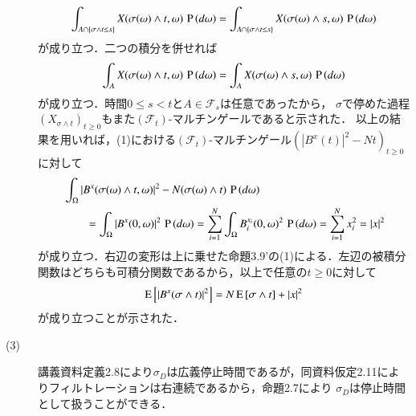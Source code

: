 \begin{prf}
\begin{description}
		\begin{align}
			\int_{A \cap \{ \sigma \wedge t \leq s \}} X(\sigma(\omega) \wedge t, \omega)\, \operatorname{P} \left(d\omega\right)
			= \int_{A \cap \{ \sigma \wedge t \leq s \}} X(\sigma(\omega) \wedge s, \omega)\, \operatorname{P} \left(d\omega\right)
		\end{align}
		が成り立つ．二つの積分を併せれば
		\begin{align}
			\int_{A} X(\sigma(\omega) \wedge t, \omega)\, \operatorname{P} \left(d\omega\right)
			= \int_{A} X(\sigma(\omega) \wedge s, \omega)\, \operatorname{P} \left(d\omega\right)
		\end{align}
		が成り立つ．時間$0 \leq s < t$と$A \in \mathcal{F}_s$は任意であったから，
		$\sigma$で停めた過程$(X_{\sigma \wedge t})_{t \geq 0}$もまた$(\mathcal{F}_t)$-マルチンゲールであると示された．
		以上の結果を用いれば，(1)における$(\mathcal{F}_t)$-マルチンゲール$\left(|B^x(t)|^2 - Nt\right)_{t \geq 0}$
		に対して
		\begin{align}
			&\int_{\Omega} |B^x(\sigma(\omega) \wedge t,\omega)|^2 - N(\sigma(\omega) \wedge t)\, \operatorname{P} \left(d\omega\right) \\
			&\qquad= \int_{\Omega} |B^x(0,\omega)|^2\, \operatorname{P} \left(d\omega\right)
			= \sum_{i=1}^{N} \int_{\Omega} B_i^{x_i}(0,\omega)^2\, \operatorname{P} \left(d\omega\right)
			= \sum_{i=1}^{N} x_i^2
			= |x|^2
		\end{align}
		が成り立つ．右辺の変形は上に乗せた命題3.9'の(1)による．左辺の被積分関数はどちらも可積分関数であるから，以上で任意の$t \geq 0$に対して
		\begin{align}
			\operatorname{E} \left[ |B^x(\sigma \wedge t)|^2 \right] = N\operatorname{E} \left[ \sigma \wedge t \right] + |x|^2
		\end{align}
		が成り立つことが示された．
		
	\item[(3)] 講義資料定義2.8により$\sigma_D$は広義停止時間であるが，同資料仮定2.11によりフィルトレーションは右連続であるから，命題2.7により
		$\sigma_D$は停止時間として扱うことができる．
\end{description}
\end{prf}